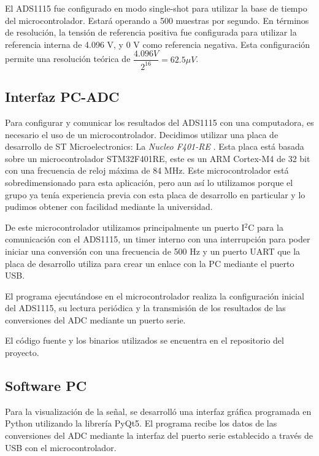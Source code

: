 \documentclass[conference]{IEEEtran}
\begin{document}
El ADS1115 fue configurado en modo single-shot para utilizar la
base de tiempo del microcontrolador. Estará operando a 500 muestras por
segundo. En términos de resolución, la tensión de referencia positiva fue configurada
para utilizar la referencia interna de 4.096 V, y 0 V como referencia negativa.
Esta configuración permite una resolución teórica de $\dfrac{4.096 V}{2^{16}} = 
62.5 \mu V$.

\subsection{Interfaz PC-ADC}

Para configurar y comunicar los resultados del ADS1115 con una computadora, es
necesario el uso de un microcontrolador. Decidimos utilizar una placa de desarrollo 
de ST Microelectronics: La \textit{Nucleo F401-RE} \cite{nucleo}. Esta placa está
basada sobre un microcontrolador STM32F401RE, este es un ARM Cortex-M4 de 32 bit
con una frecuencia de reloj máxima de 84 MHz. Este microcontrolador está
sobredimensionado para esta aplicación, pero aun así lo utilizamos porque el
grupo ya tenía experiencia previa con esta placa de desarrollo en particular y lo
pudimos obtener con facilidad mediante la universidad.

De este microcontrolador utilizamos principalmente un puerto I$^2$C para la
comunicación con el ADS1115, un timer interno con una interrupción para poder
iniciar una conversión con una frecuencia de 500 Hz y un puerto UART que la placa
de desarrollo utiliza para crear un enlace con la PC mediante el puerto USB.

El programa ejecutándose en el microcontrolador realiza la configuración inicial del
ADS1115, su lectura periódica y la transmisión de los resultados de las conversiones
del ADC mediante un puerto serie.

El código fuente y los binarios utilizados se encuentra en el repositorio del
proyecto. \cite{repository} 

\subsection{Software PC}\label{software-pc}

Para la visualización de la señal, se desarrolló una interfaz gráfica programada
en Python utilizando la librería PyQt5. El programa recibe los datos de las
conversiones del ADC mediante la interfaz del puerto serie establecido a través de
USB con el microcontrolador.
\end{document}
